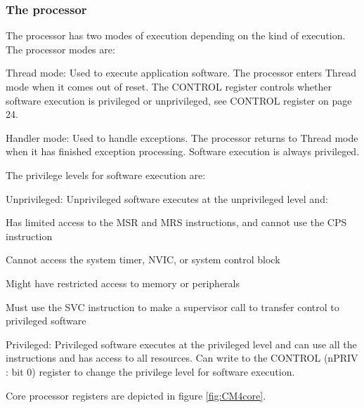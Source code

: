 \subsubsection{The processor}

The processor has two modes of execution depending on the kind of execution.
The processor modes are:
\begin{penum}
\item Thread mode: Used to execute application software.
The processor enters Thread mode when it comes out of reset.
The CONTROL register controls whether software execution is privileged or unprivileged, see CONTROL register on page 24.
\item Handler mode: Used to handle exceptions.
The processor returns to Thread mode when it has finished exception processing.
Software execution is always privileged.
\end{penum}

The privilege levels for software execution are:
\begin{penum}
\item Unprivileged: Unprivileged software executes at the unprivileged level and:
	\begin{penum}
	\item Has limited access to the MSR and MRS instructions, and cannot use the CPS instruction
	\item Cannot access the system timer, NVIC, or system control block
	\item Might have restricted access to memory or peripherals
	\item Must use the SVC instruction to make a supervisor call to transfer control to privileged software
	\end{penum}
\item Privileged: Privileged software executes at the privileged level and can use all the instructions and has access to all resources.
Can write to the CONTROL (nPRIV : bit 0) register to change the privilege level for software execution.
\end{penum}

Core processor registers are depicted in figure \ref{fig:CM4core}.

